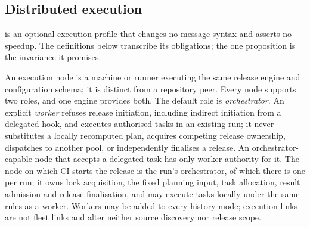 \subsection{Distributed execution}
\label{sec:exec-distributed}

 is an optional execution profile that changes no message syntax and
asserts no speedup. The definitions below transcribe its obligations; the one
proposition is the invariance it promises.

\begin{definition}
\label{def:exec-roles}
An execution node is a machine or runner executing the same release engine and
configuration schema; it is distinct from a repository peer. Every node
supports two roles, and one engine provides both. The default role is
\emph{orchestrator}. An explicit \emph{worker} refuses release initiation,
including indirect initiation from a delegated hook, and executes authorised
tasks in an existing run; it never substitutes a locally recomputed plan,
acquires competing release ownership, dispatches to another pool, or
independently finalises a release. An orchestrator-capable node that accepts
a delegated task has only worker authority for it. The node on which CI starts
the release is the run's orchestrator, of which there is one per run; it owns
lock acquisition, the fixed planning input, task allocation, result admission
and release finalisation, and may execute tasks locally under the same rules
as a worker. Workers may be added to every history mode; execution links are
not fleet links and alter neither source discovery nor release scope.
\end{definition}

